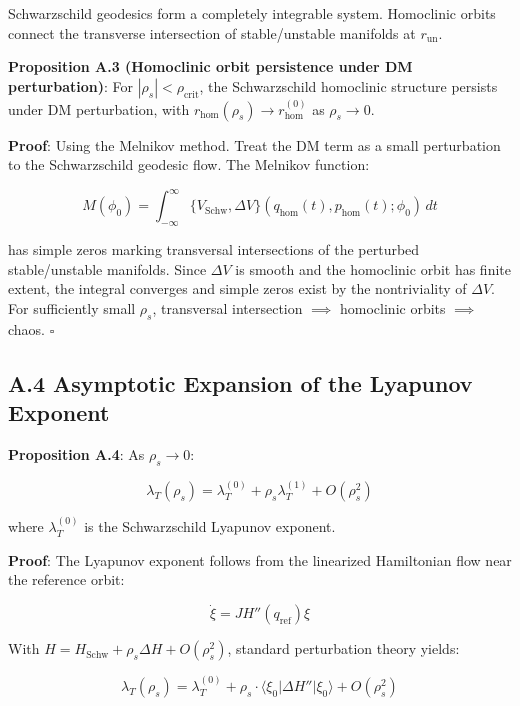 \documentclass[12pt]{article}
\begin{document}
Schwarzschild geodesics form a completely integrable system. Homoclinic orbits connect the transverse intersection of stable/unstable manifolds at $r_{\text{un}}$.

\textbf{Proposition A.3 (Homoclinic orbit persistence under DM perturbation)}: For $|\rho_s| < \rho_{\text{crit}}$, the Schwarzschild homoclinic structure persists under DM perturbation, with $r_{\text{hom}}(\rho_s) \to r_{\text{hom}}^{(0)}$ as $\rho_s \to 0$.

\textbf{Proof}: Using the Melnikov method. Treat the DM term as a small perturbation to the Schwarzschild geodesic flow. The Melnikov function:

\begin{equation}
M(\phi_0) = \int_{-\infty}^{\infty} \{V_{\text{Schw}}, \Delta V\}(q_{\text{hom}}(t), p_{\text{hom}}(t); \phi_0) \, dt
\end{equation}

has simple zeros marking transversal intersections of the perturbed stable/unstable manifolds. Since $\Delta V$ is smooth and the homoclinic orbit has finite extent, the integral converges and simple zeros exist by the nontriviality of $\Delta V$. For sufficiently small $\rho_s$, transversal intersection $\implies$ homoclinic orbits $\implies$ chaos. $\square$

\subsection{A.4 Asymptotic Expansion of the Lyapunov Exponent}

\textbf{Proposition A.4}: As $\rho_s \to 0$:

\begin{equation}
\lambda_T(\rho_s) = \lambda_T^{(0)} + \rho_s \lambda_T^{(1)} + O(\rho_s^2)
\end{equation}

where $\lambda_T^{(0)}$ is the Schwarzschild Lyapunov exponent.

\textbf{Proof}: The Lyapunov exponent follows from the linearized Hamiltonian flow near the reference orbit:

\begin{equation}
\dot{\xi} = J H''(q_{\text{ref}}) \xi
\end{equation}

With $H = H_{\text{Schw}} + \rho_s \Delta H + O(\rho_s^2)$, standard perturbation theory yields:

\begin{equation}
\lambda_T(\rho_s) = \lambda_T^{(0)} + \rho_s \cdot \langle \xi_0 | \Delta H'' | \xi_0 \rangle + O(\rho_s^2)
\end{equation}
\end{document}
